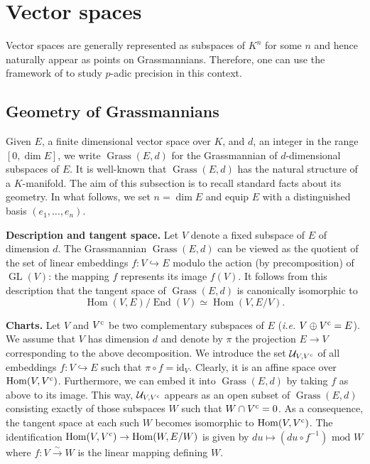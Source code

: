 \documentclass{sig-alternate}
\DeclareMathOperator{\Hom}{Hom}
\DeclareMathOperator{\End}{End}
\DeclareMathOperator{\GL}{GL}
\DeclareMathOperator{\Grass}{Grass}
\newcommand{\id}{\textrm{id}}
\renewcommand{\c}{\text{\rm c}}
\def\todo#1{\ \!\!{\color{red} #1}}
\begin{document}
%

\section{Vector spaces}
\label{sec:vectorspaces}

Vector spaces are generally represented as subspaces of $K^n$ for some 
$n$ and hence naturally appear as points on Grassmannians. Therefore, 
one can use the framework of \cite[Appendix A]{caruso-roe-vaccon:14a} to 
study $p$-adic precision in this context.

\subsection{Geometry of Grassmannians}
\label{ssec:grassgeo}

Given $E$, a finite dimensional vector space over $K$, and $d$, an 
integer in the range $[0, \dim E]$, we write $\Grass(E,d)$ for the
Grassmannian of $d$-dimensional subspaces of $E$. It is well-known
that $\Grass(E,d)$ has the natural structure of a $K$-manifold. The aim of
this subsection is to recall standard facts about its geometry. In what follows,
we set $n = \dim E$ and equip $E$ with a distinguished basis
$(e_1, \ldots, e_n)$.

\smallskip

\noindent
{\bf Description and tangent space.}
Let $V$ denote a fixed subspace of $E$ of dimension $d$. The 
Grassmannian $\Grass(E,d)$ can be viewed as the quotient of the set 
of linear embeddings $f: V \hookrightarrow E$ modulo the action (by 
precomposition) of $\GL(V)$: the mapping $f$ represents its image 
$f(V)$. It follows from this description that the tangent space of 
$\Grass(E,d)$ is canonically isomorphic to $$\Hom(V, E) / \End(V) 
\simeq \Hom(V, E/V).$$

\smallskip

\noindent
{\bf Charts.}
Let $V$ and $V^\c$ be two complementary subspaces of $E$ 
(\emph{i.e.} $V \oplus V^\c = E$). We assume that $V$ has 
dimension $d$ and denote by $\pi$ the projection $E \to V$ 
corresponding to the above decomposition. We introduce the set 
$\mathcal U_{V,V^\c}$ of all embeddings $f : V \hookrightarrow E$ 
such that $\pi \circ f = \id_V$. Clearly, it is an affine space over
$\Hom(V,V^\c)$. 
Furthermore, we can embed it into $\Grass(E,d)$ by taking $f$ as
above to its image. This way, $\mathcal U_{V,V^\c}$ appears as
an open subset of $\Grass(E,d)$ consisting exactly of those subspaces 
$W$ such that $W \cap V^\c = 0$. As a consequence, the tangent space 
at each such $W$ becomes isomorphic to $\Hom(V,V^\c)$. The
identification $\Hom(V,V^\c) \to \Hom(W, E/W)$ is given by
$du \mapsto (du \circ f^{-1}) \text{ mod } W$ where $f : V 
\stackrel{\sim}{\to} W$ is the linear mapping defining $W$.
\end{document}
